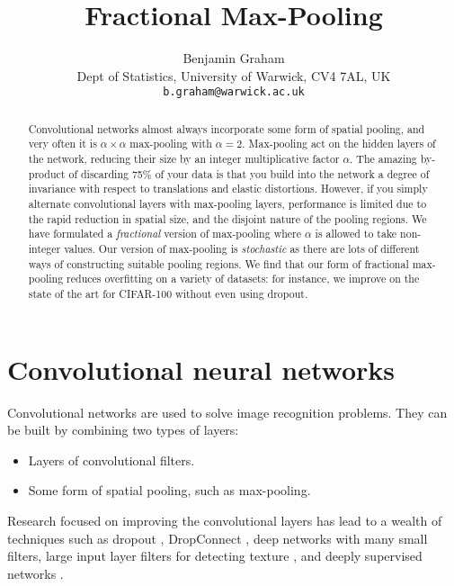\documentclass[english]{article}
\begin{document}
\title{Fractional Max-Pooling}

\author{
Benjamin Graham\\
{\small Dept of Statistics, University of Warwick, CV4 7AL, UK}\\
{\small \tt b.graham@warwick.ac.uk}\\
}
\maketitle
\begin{abstract}
Convolutional networks almost always incorporate some form of spatial
pooling, and very often it is $\alpha\times\alpha$ max-pooling with
$\alpha=2$. Max-pooling act on the hidden layers of the network,
reducing their size by an integer multiplicative factor $\alpha$.
The amazing by-product of discarding 75\% of your data is that you
build into the network a degree of invariance with respect to translations
and elastic distortions. However, if you simply alternate convolutional
layers with max-pooling layers, performance is limited due to the
rapid reduction in spatial size, and the disjoint nature of the pooling
regions. We have formulated a \emph{fractional} version of max-pooling
where $\alpha$ is allowed to take non-integer values. Our version
of max-pooling is \emph{stochastic} as there are lots of different
ways of constructing suitable pooling regions. We find that our form
of fractional max-pooling reduces overfitting on a variety of datasets:
for instance, we improve on the state of the art for CIFAR-100 without
even using dropout.
\end{abstract}

\section{Convolutional neural networks}

Convolutional networks are used to solve image recognition problems.
They can be built by combining two types of layers:
\begin{itemize}
\item Layers of convolutional filters.
\item Some form of spatial pooling, such as max-pooling.
\end{itemize}
Research focused on improving the convolutional layers has lead to
a wealth of techniques such as dropout \cite{dropout}, DropConnect
\cite{DropConnect}, deep networks with many small filters\cite{multicolumndeep},
large input layer filters for detecting texture \cite{conf/nips/KrizhevskySH12},
and deeply supervised networks \cite{DeeplySupervisedNets}.
\end{document}
